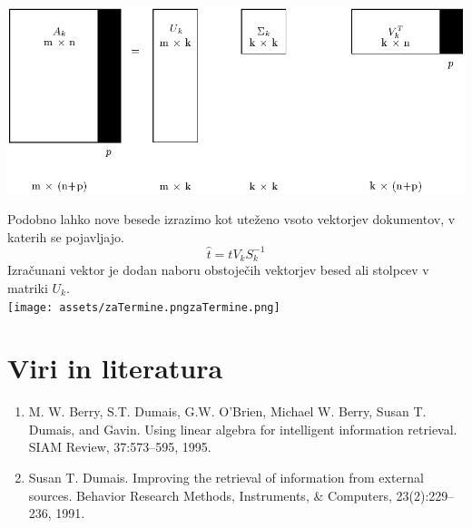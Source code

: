 \documentclass{article}
\begin{document}
\includegraphics[scale=0.5]{assets/zaDokumente.png}
\\
\par Podobno lahko nove besede izrazimo kot uteženo vsoto vektorjev dokumentov, v katerih se pojavljajo.
\[ \hat{t} = tV_kS^{-1}_k\]
Izračunani vektor je dodan naboru obstoječih vektorjev besed ali stolpcev v matriki $U_k$. \\

\texttt{[image: assets/zaTermine.pngzaTermine.png]}

\section{Viri in literatura}
\begin{enumerate}
    \item  M. W. Berry, S.T. Dumais, G.W. O’Brien, Michael W. Berry, Susan T.
    Dumais, and Gavin. Using linear algebra for intelligent information retrieval.
    SIAM Review, 37:573–595, 1995.
    \item Susan T. Dumais. Improving the retrieval of information from external 
    sources. Behavior Research Methods, Instruments, \& Computers, 23(2):229–
    236, 1991.
\end{enumerate}
\end{document}
